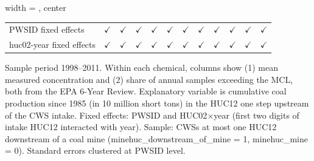 \begin{table}[htbp]
\begin{adjustbox}{width = \textwidth, center}
\begin{tabular}{lccccccccccc}
          \\
         
         PWSID fixed effects                 & $\checkmark$          & $\checkmark$          & $\checkmark$  & $\checkmark$  & $\checkmark$    & $\checkmark$    & $\checkmark$          & $\checkmark$         & $\checkmark$    & $\checkmark$          & $\checkmark$\\   
         huc02-year fixed effects            & $\checkmark$          & $\checkmark$          & $\checkmark$  & $\checkmark$  & $\checkmark$    & $\checkmark$    & $\checkmark$          & $\checkmark$         & $\checkmark$    & $\checkmark$          & $\checkmark$\\   
         
         \bottomrule
         
      \end{tabular}
      
      
      
   \end{adjustbox}
      {\tiny\linespread{1}\selectfont \par \raggedright 
   Sample period 1998--2011. Within each chemical, columns show (1) mean measured concentration and (2) share of annual samples exceeding the MCL, both from the EPA 6-Year Review. Explanatory variable is cumulative coal production since 1985 (in 10 million short tons) in the HUC12 one step upstream of the CWS intake. Fixed effects: PWSID and HUC02$\times$year (first two digits of intake HUC12 interacted with year). Sample: CWSs at most one HUC12 downstream of a coal mine (minehuc\_downstream\_of\_mine = 1, minehuc\_mine = 0). Standard errors clustered at PWSID level.}
   
\end{table}


